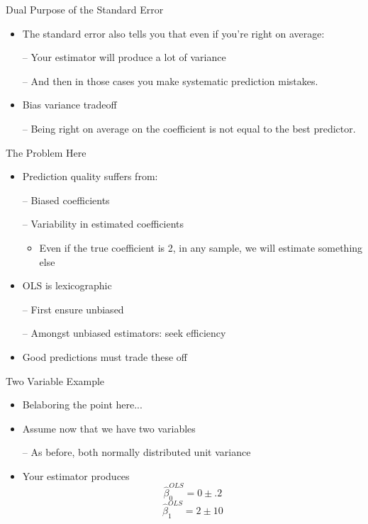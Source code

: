 \documentclass{beamer}
\begin{document}
\begin{frame}{Dual Purpose of the Standard Error}
	\begin{itemize}
		\item The standard error also tells you that even if you’re right on average:
		
		– Your estimator will produce a lot of variance 
		
		– And then in those cases you make systematic prediction mistakes.
		\item Bias variance tradeoff
		
		– Being right on average on the coefficient is not equal to the best predictor.
	\end{itemize}
\end{frame}

\begin{frame}{The Problem Here}
	\begin{itemize}
		\item Prediction quality suffers from:
		
		– Biased coefficients
		
		– Variability in estimated coefficients
		\begin{itemize}
			\item Even if the true coefficient is 2, in any sample, we will estimate something else
		\end{itemize}
		    
		\item OLS is lexicographic
		
		– First ensure unbiased
		
		– Amongst unbiased estimators: seek efficiency
		
		\item Good predictions must trade these off
	\end{itemize}
\end{frame}

\begin{frame}{Two Variable Example}
	\begin{itemize}
		\item Belaboring the point here...		
		\item Assume now that we have two variables
		
		– As before, both normally distributed unit variance
		
		\item Your estimator produces
		$$\hat{\beta}_0^{OLS}=0\pm.2$$
		$$\hat{\beta}_1^{OLS}=2\pm10$$
	\end{itemize}
\end{frame}
\end{document}
